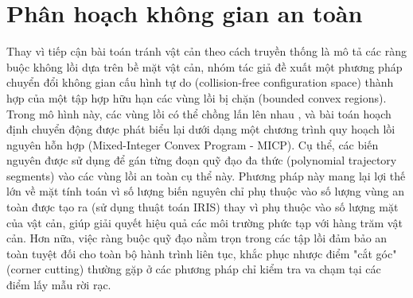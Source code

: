 \section{Phân hoạch không gian an toàn}
Thay vì tiếp cận bài toán tránh vật cản theo cách truyền thống là mô tả các ràng buộc không lồi dựa trên bề mặt vật cản, nhóm tác giả đề xuất một phương pháp chuyển đổi không gian cấu hình tự do (collision-free configuration space) thành hợp của một tập hợp hữu hạn các vùng lồi bị chặn (bounded convex regions). Trong mô hình này, các vùng lồi có thể chồng lấn lên nhau , và bài toán hoạch định chuyển động được phát biểu lại dưới dạng một chương trình quy hoạch lồi nguyên hỗn hợp (Mixed-Integer Convex Program - MICP). Cụ thể, các biến nguyên được sử dụng để gán từng đoạn quỹ đạo đa thức (polynomial trajectory segments) vào các vùng lồi an toàn cụ thể này. Phương pháp này mang lại lợi thế lớn về mặt tính toán vì số lượng biến nguyên chỉ phụ thuộc vào số lượng vùng an toàn được tạo ra (sử dụng thuật toán IRIS) thay vì phụ thuộc vào số lượng mặt của vật cản, giúp giải quyết hiệu quả các môi trường phức tạp với hàng trăm vật cản. Hơn nữa, việc ràng buộc quỹ đạo nằm trọn trong các tập lồi đảm bảo an toàn tuyệt đối cho toàn bộ hành trình liên tục, khắc phục nhược điểm "cắt góc" (corner cutting) thường gặp ở các phương pháp chỉ kiểm tra va chạm tại các điểm lấy mẫu rời rạc.